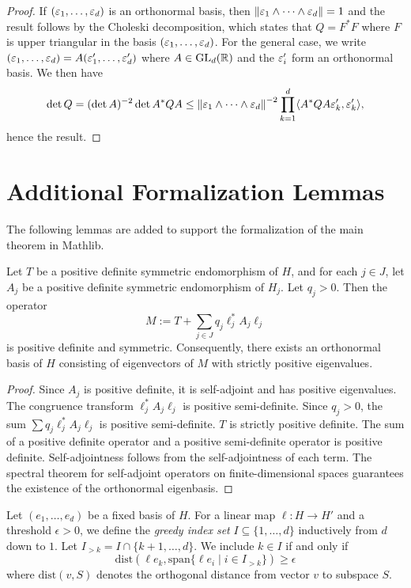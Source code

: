 \begin{proof}
If  $(\varepsilon_{1}, \dots, \varepsilon_{d})$ is an orthonormal basis, then $\|\varepsilon_{1}\wedge \dots \wedge \varepsilon_{d}\|=1$ and the result follows by  the Choleski decomposition, which states  that $Q=F^*F$ where $F$ is upper triangular in the basis $(\varepsilon_{1}, \dots, \varepsilon_{d})$. For the general case, we  write $(\varepsilon_{1}, \dots, \varepsilon_{d})=A(\varepsilon'_{1}, \dots, \varepsilon'_{d})$ where $A\in \mathrm{GL}_{d}(\mathbb{R})$ and the $\varepsilon'_{i}$ form an orthonormal basis. We then have
$$\det Q = (\det A)^{-2}\det A^*Q A \leq \left\lVert \varepsilon_{1}\wedge \dots \wedge \varepsilon_{d} \right\rVert^{-2} \prod_{k=1}^d \langle A^*Q A \varepsilon'_{k}, \varepsilon'_{k}\rangle,$$
hence the result.
\end{proof}

\section{Additional Formalization Lemmas}

The following lemmas are added to support the formalization of the main theorem in Mathlib.

\begin{lemma}[Positivity of M]
\label{lem:M_pos_def}
Let $T$ be a positive definite symmetric endomorphism of $H$, and for each $j \in J$, let $A_j$ be a positive definite symmetric endomorphism of $H_j$. Let $q_j > 0$. Then the operator
$$M := T + \sum_{j \in J} q_j \ell_j^* A_j \ell_j$$
is positive definite and symmetric. Consequently, there exists an orthonormal basis of $H$ consisting of eigenvectors of $M$ with strictly positive eigenvalues.
\end{lemma}

\begin{proof}
Since $A_j$ is positive definite, it is self-adjoint and has positive eigenvalues. The congruence transform $\ell_j^* A_j \ell_j$ is positive semi-definite. Since $q_j > 0$, the sum $\sum q_j \ell_j^* A_j \ell_j$ is positive semi-definite. $T$ is strictly positive definite. The sum of a positive definite operator and a positive semi-definite operator is positive definite. Self-adjointness follows from the self-adjointness of each term. The spectral theorem for self-adjoint operators on finite-dimensional spaces guarantees the existence of the orthonormal eigenbasis.
\end{proof}

\begin{definition}
\label{def:greedy_sets}
Let $(e_1, \dots, e_d)$ be a fixed basis of $H$. For a linear map $\ell: H \to H'$ and a threshold $\epsilon > 0$, we define the \emph{greedy index set} $I \subseteq \{1, \dots, d\}$ inductively from $d$ down to $1$.
Let $I_{>k} = I \cap \{k+1, \dots, d\}$.
We include $k \in I$ if and only if
$$\mathrm{dist}(\ell e_k, \mathrm{span}\{\ell e_i \mid i \in I_{>k}\}) \ge \epsilon$$
where $\mathrm{dist}(v, S)$ denotes the orthogonal distance from vector $v$ to subspace $S$.
\end{definition}


